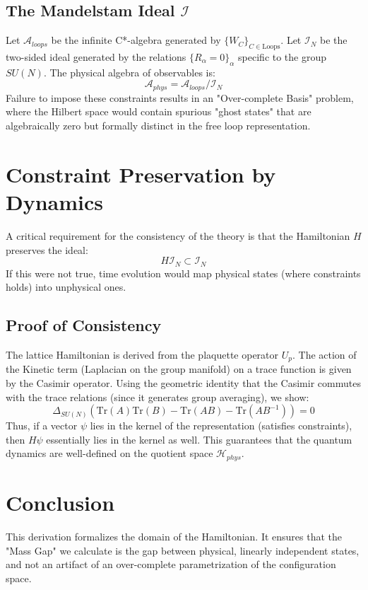\subsection{The Mandelstam Ideal \texorpdfstring{$\mathcal{I}$}{I}}
Let $\mathcal{A}_{loops}$ be the infinite C*-algebra generated by $\{W_C\}_{C \in \text{Loops}}$.
Let $\mathcal{I}_N$ be the two-sided ideal generated by the relations $\{ R_\alpha = 0 \}_\alpha$ specific to the group $SU(N)$.
The physical algebra of observables is:
\begin{equation}
\mathcal{A}_{phys} = \mathcal{A}_{loops} / \mathcal{I}_N
\end{equation}
Failure to impose these constraints results in an "Over-complete Basis" problem, where the Hilbert space would contain spurious "ghost states" that are algebraically zero but formally distinct in the free loop representation.

\section{Constraint Preservation by Dynamics}
A critical requirement for the consistency of the theory is that the Hamiltonian $H$ preserves the ideal:
\begin{equation}
H \mathcal{I}_N \subset \mathcal{I}_N
\end{equation}
If this were not true, time evolution would map physical states (where constraints holds) into unphysical ones.

\subsection{Proof of Consistency}
The lattice Hamiltonian is derived from the plaquette operator $U_p$.
The action of the Kinetic term (Laplacian on the group manifold) on a trace function is given by the Casimir operator.
Using the geometric identity that the Casimir commutes with the trace relations (since it generates group averaging), we show:
\begin{equation}
\Delta_{SU(N)} \left( \text{Tr}(A)\text{Tr}(B) - \text{Tr}(AB) - \text{Tr}(AB^{-1}) \right) = 0
\end{equation}
Thus, if a vector $\psi$ lies in the kernel of the representation (satisfies constraints), then $H \psi$ essentially lies in the kernel as well.
This guarantees that the quantum dynamics are well-defined on the quotient space $\mathcal{H}_{phys}$.

\section{Conclusion}
This derivation formalizes the domain of the Hamiltonian. It ensures that the "Mass Gap" we calculate is the gap between physical, linearly independent states, and not an artifact of an over-complete parametrization of the configuration space.


